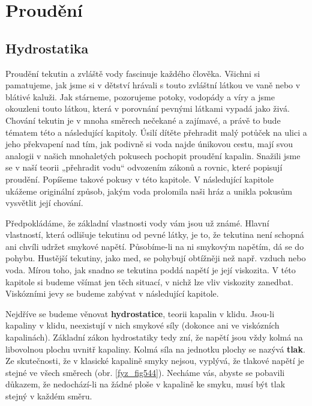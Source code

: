{
\chapter{Proudění }\label{fyz:IIchapXL}
\minitoc
  \section{Hydrostatika}\label{fyz:IIchapXLsecI}
    Proudění tekutin a zvláště vody fascinuje každého člověka. Všichni si pamatujeme, jak jsme si v 
    dětství hrávali s touto zvláštní látkou ve vaně nebo v blátivé kaluži. Jak stárneme, pozorujeme 
    potoky, vodopády a víry a jsme okouzleni touto látkou, která v porovnání pevnými látkami vypadá 
    jako živá. Chování tekutin je v mnoha směrech nečekané a zajímavé, a právě to bude tématem této 
    a následující kapitoly. Úsilí dítěte přehradit malý potůček na ulici a jeho překvapení nad tím, 
    jak podivně si voda najde únikovou cestu, mají svou analogii v našich mnohaletých pokusech 
    pochopit proudění kapalin. Snažili jsme se v naší teorii „přehradit vodu“ odvozením zákonů a 
    rovnic, které popisují proudění. Popíšeme takové pokusy v této kapitole. V následující kapitole 
    ukážeme originální způsob, jakým voda prolomila naši hráz a unikla pokusům vysvětlit její 
    chování.
    
    Předpokládáme, že základní vlastnosti vody vám jsou už známé. Hlavní vlastností, která odlišuje 
    tekutinu od pevné látky, je to, že tekutina není schopná ani chvíli udržet smykové napětí. 
    Působíme-li na ni smykovým napětím, dá se do pohybu. Hustější tekutiny, jako med, se pohybují 
    obtížněji než např. vzduch nebo voda. Mírou toho, jak snadno se tekutina poddá napětí je její 
    viskozita. V této kapitole si budeme všímat jen těch situací, v nichž lze vliv viskozity 
    zanedbat. Viskózními jevy se budeme zabývat v následující kapitole.
    
    Nejdříve se budeme věnovat \textbf{hydrostatice}, teorii kapalin v klidu. Jsou-li kapaliny v 
    klidu, neexistují v nich smykové síly (dokonce ani ve viskózních kapalinách). Základní zákon 
    hydrostatiky tedy zní, že napětí jsou vždy kolmá na libovolnou plochu uvnitř kapaliny. Kolmá 
    síla na jednotku plochy se nazývá \textbf{tlak}. Ze skutečnosti, že v klasické kapalině smyky 
    nejsou, vyplývá, že tlakové napětí je stejné ve všech směrech (obr. \ref{fyz_fig544}). Necháme 
    vás, abyste se pobavili důkazem, že nedochází-li na žádné ploše v kapalině ke smyku, musí být 
    tlak stejný v každém směru.
    
}
